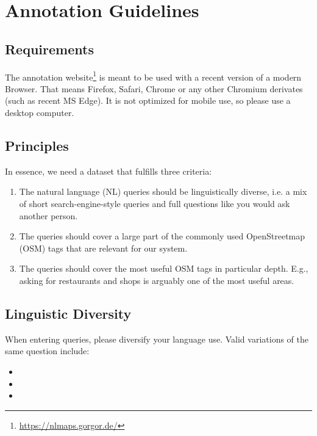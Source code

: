 \chapter{Annotation Guidelines}
\label{ch:annotation-guidelines}

\section{Requirements}

The annotation website\footnote{\url{https://nlmaps.gorgor.de/}} is meant to be
used with a recent version of a modern Browser. That means Firefox, Safari,
Chrome or any other Chromium derivates (such as recent MS Edge). It is not
optimized for mobile use, so please use a desktop computer.

\section{Principles}

In essence, we need a dataset that fulfills three criteria:

\begin{enumerate}
\item The natural language (NL) queries should be linguistically diverse, i.e. a mix of short search-engine-style queries and full questions like you would ask another person.
\item The queries should cover a large part of the commonly used OpenStreetmap (OSM) tags that are relevant for our system.
\item The queries should cover the most useful OSM tags in particular depth. E.g., asking for restaurants and shops is arguably one of the most useful areas.
\end{enumerate}

\section{Linguistic Diversity}

When entering queries, please diversify your language use. Valid variations of
the same question include:

\begin{itemize}
\item {}
\item {}
\item {}
\end{itemize}

